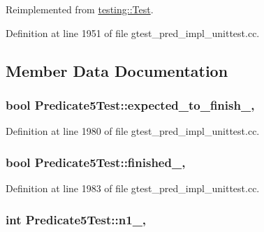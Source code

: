 Reimplemented from \hyperlink{classtesting_1_1_test_a5f0ab439802cbe0ef7552f1a9f791923}{testing\+::\+Test}.



Definition at line 1951 of file gtest\+\_\+pred\+\_\+impl\+\_\+unittest.\+cc.



\subsection{Member Data Documentation}
\subsubsection[{\texorpdfstring{expected\+\_\+to\+\_\+finish\+\_\+}{expected_to_finish_}}]{\setlength{\rightskip}{0pt plus 5cm}bool Predicate5\+Test\+::expected\+\_\+to\+\_\+finish\+\_\+\hspace{0.3cm}{\ttfamily [static]}, {\ttfamily [protected]}}\hypertarget{class_predicate5_test_aa502b7a330cc5c64785ff59aad3ef180}{}\label{class_predicate5_test_aa502b7a330cc5c64785ff59aad3ef180}


Definition at line 1980 of file gtest\+\_\+pred\+\_\+impl\+\_\+unittest.\+cc.

\subsubsection[{\texorpdfstring{finished\+\_\+}{finished_}}]{\setlength{\rightskip}{0pt plus 5cm}bool Predicate5\+Test\+::finished\+\_\+\hspace{0.3cm}{\ttfamily [static]}, {\ttfamily [protected]}}\hypertarget{class_predicate5_test_a5003aada64accf06cdb28b1ff1797353}{}\label{class_predicate5_test_a5003aada64accf06cdb28b1ff1797353}


Definition at line 1983 of file gtest\+\_\+pred\+\_\+impl\+\_\+unittest.\+cc.

\subsubsection[{\texorpdfstring{n1\+\_\+}{n1_}}]{\setlength{\rightskip}{0pt plus 5cm}int Predicate5\+Test\+::n1\+\_\+\hspace{0.3cm}{\ttfamily [static]}, {\ttfamily [protected]}}\hypertarget{class_predicate5_test_a356c8e361185b234a417ed895eb14e38}{}\label{class_predicate5_test_a356c8e361185b234a417ed895eb14e38}


